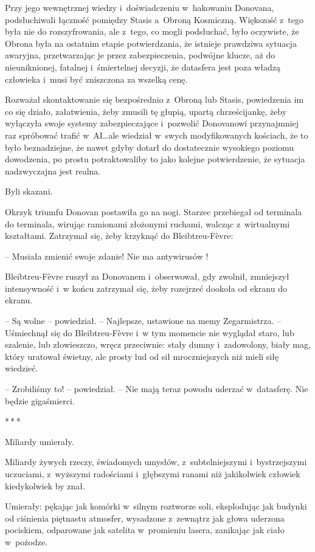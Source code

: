 \documentclass[oneside,polish,11pt,sfheadings]{mwbk}
\newcommand{\threeast}{\bigskip\par\centerline{*\,*\,*}\medskip\par}%
\begin{document}
Przy jego wewnętrznej wiedzy i~doświadczeniu w~hakowaniu Donovana,
podsłuchiwali łączność pomiędzy Stasis a~Obroną Kosmiczną. Większość z~tego była nie do rozszyfrowania, ale z~tego, co mogli podsłuchać, było
oczywiste, że Obrona była na ostatnim etapie potwierdzania, że istnieje
prawdziwa sytuacja awaryjna, przetwarzając je przez zabezpieczenia,
podwójne klucze, aż do nieuniknionej, fatalnej i~śmiertelnej decyzji, że
datasfera jest poza władzą człowieka i~musi być zniszczona za wszelką
cenę.

Rozważał skontaktowanie się bezpośrednio z~Obroną lub Stasis,
powiedzenia im co się działo, załatwienia, żeby zmusili tę głupią,
upartą chrześcijankę, żeby wyłączyła swoje systemy zabezpieczające i~pozwolić Donovanowi przynajmniej raz spróbować trafić w~AI\ldots ale
wiedział w~swych modyfikowanych kościach, że to było beznadziejne, że
nawet gdyby dotarł do dostatecznie wysokiego poziomu dowodzenia, po
prostu potraktowaliby to jako kolejne potwierdzenie, że sytuacja
nadzwyczajna jest realna.

Byli skazani.

Okrzyk triumfu Donovan postawiła go na nogi. Starzec przebiegał od
terminala do terminala, wirując ramionami złożonymi ruchami, walcząc z~wirtualnymi kształtami. Zatrzymał się, żeby krzyknąć do Bleibtreu-Fèvre:

-- Musiała zmienić swoje zdanie! Nie ma antywirusów !

Bleibtreu-Fèvre ruszył za Donovanem i~obserwował, gdy zwolnił,
zmniejszył intensywność i~w końcu zatrzymał się, żeby rozejrzeć dookoła
od ekranu do ekranu.

-- Są wolne -- powiedział. -- Najlepsze, ustawione na memy Zegarmistrza. -- Uśmiechnął się do Bleibtreu-Fèvre i~w tym momencie nie wyglądał staro,
lub szalenie, lub złowieszczo, wręcz przeciwnie: stały dumny i~zadowolony, biały mag, który uratował świetny, ale prosty lud od sił
mroczniejszych niż mieli siłę wiedzieć.

-- Zrobiliśmy to! -- powiedział. -- Nie mają teraz powodu uderzać w~datasferę. Nie będzie gigaśmierci.
  \threeast 

Miliardy umierały.

Miliardy żywych rzeczy, świadomych umysłów, z~subtelniejszymi i~bystrzejszymi uczuciami, z~wyższymi radościami i~głębszymi ranami niż
jakikolwiek człowiek kiedykolwiek by znał.

Umierały: pękając jak komórki w~silnym roztworze soli, eksplodując jak
budynki od ciśnienia piętnastu atmosfer, wysadzone z~zewnątrz jak głowa
uderzona pociskiem, odparowane jak satelita w~promieniu lasera,
zanikając jak ciało w~pożodze.
\end{document}
